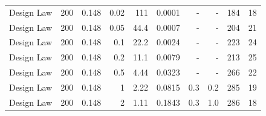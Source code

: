\begin{tabular}{lrrrrrrrrr}
Design Law & 200 & 0.148 & 0.02 & 111 & 0.0001 & - & - & 184 & 18 \\
Design Law & 200 & 0.148 & 0.05 & 44.4 & 0.0007 & - & - & 204 & 21 \\
Design Law & 200 & 0.148 & 0.1 & 22.2 & 0.0024 & - & - & 223 & 24 \\
Design Law & 200 & 0.148 & 0.2 & 11.1 & 0.0079 & - & - & 213 & 25 \\
Design Law & 200 & 0.148 & 0.5 & 4.44 & 0.0323 & - & - & 266 & 22 \\
Design Law & 200 & 0.148 & 1 & 2.22 & 0.0815 & 0.3 & 0.2 & 285 & 19 \\
Design Law & 200 & 0.148 & 2 & 1.11 & 0.1843 & 0.3 & 1.0 & 286 & 18 \\
\bottomrule
\end{tabular}
